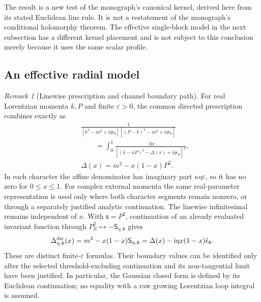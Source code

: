 \documentclass[final,5p,times,twocolumn,numbers,nopreprintline]{elsarticle}
\numberwithin{equation}{section}
\theoremstyle{definition}
\theoremstyle{remark}
\newtheorem{remark}[theorem]{Remark}
\newcommand{\dd}{\mathop{}\!\mathrm d}
\newcommand{\ii}{\mathrm i}
\newcommand{\bb}{\mathfrak b}
\newcommand{\epsvec}{\hat\epsilon_{\bb}}
\newcommand{\sMand}{\mathsf{s}}
\begin{document}
The result is a new test of the monograph's canonical kernel,
derived here from its stated Euclidean line rule. It is not a
restatement of the monograph's conditional holomorphy theorem.
The effective single-block model in the next subsection has a
different kernel placement and is not subject to this conclusion
merely because it uses the same scalar profile.

\subsection{An effective radial model}
\label{sec:effective-block}

\begin{remark}[Linewise prescription and channel boundary path]
\label{rem:linewise-versus-channel-boundary}
For real Lorentzian momenta \(k,P\) and finite
\(\varepsilon>0\), the common directed prescription combines
exactly as
\begin{align}
 &\frac1{[k^2-m^2+\ii\eta\epsvec]
             [(P-k)^2-m^2+\ii\eta\epsvec]}
       \nonumber\\
 &\qquad=\int_0^1
       \frac{\dd x}{[(k-xP)^2-\Delta(x)
                                      +\ii\eta\epsvec]^2},
 \nonumber\\
 &\Delta(x)=m^2-x(1-x)P^2.
 \label{eq:exact-directed-Feynman-combination}
\end{align}
In each character the affine denominator has imaginary part
\(\kappa\eta\varepsilon\), so it has no zero for
\(0\leq x\leq1\). For complex external momenta the same
real-parameter representation is used only where both character
segments remain nonzero, or through a separately justified
analytic continuation.
The linewise infinitesimal remains independent of \(x\).
With \(\sMand=P^2\), continuation of an already evaluated
invariant function through
\(P_E^2\mapsto-\mathsf S_{\eta,\bb}\) gives
\begin{equation}
 \Delta^{\rm dir}_{\eta,\bb}(x)
   =m^2-x(1-x)\mathsf S_{\eta,\bb}
   =\Delta(x)-\ii\eta x(1-x)\epsvec.
 \label{eq:channel-directed-effective-denominator}
\end{equation}
These are distinct finite-\(\varepsilon\) formulas. Their
boundary values can be identified only after the selected
threshold-excluding continuation and its non-tangential limit
have been justified. In particular, the Gaussian closed form is
defined by its Euclidean continuation; no equality with a raw
growing Lorentzian loop integral is assumed.
\end{remark}
\end{document}
